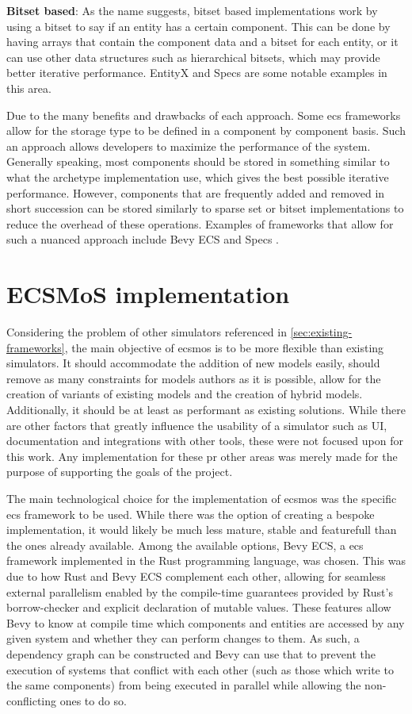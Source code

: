 \documentclass[twoside, 11pt]{article}
\begin{document}
\textbf{Bitset based}: As the name suggests, bitset based implementations work by using a bitset to say if an entity has a certain component. This can be done by having arrays that contain the component data and a bitset for each entity, or it can use other data structures such as hierarchical bitsets, which may provide better iterative performance. EntityX \cite{entityx} and Specs \cite{specs} are some notable examples in this area.

Due to the many benefits and drawbacks of each approach. Some \gls{ecs} frameworks allow for the storage type to be defined in a component by component basis. Such an approach allows developers to maximize the performance of the system. Generally speaking, most components should be stored in something similar to what the archetype implementation use, which gives the best possible iterative performance. However, components that are frequently added and removed in short succession can be stored similarly to sparse set or bitset implementations to reduce the overhead of these operations. Examples of frameworks that allow for such a nuanced approach include Bevy ECS \cite{bevy} and Specs \cite{specs}.

\section{ ECSMoS implementation} \label{sec:ecsmos-implementation}

Considering the problem of other simulators referenced in \autoref{sec:existing-frameworks}, the main objective of \gls{ecsmos} is to be more flexible than existing simulators. It should accommodate the addition of new models easily, should remove as many constraints for models authors as it is possible, allow for the creation of variants of existing models and the creation of hybrid models. Additionally, it should be at least as performant as existing solutions. While there are other factors that greatly influence the usability of a simulator such as UI, documentation and integrations with other tools, these were not focused upon for this work. Any implementation for these pr other areas was merely made for the purpose of supporting the goals of the project.

The main technological choice for the implementation of \gls{ecsmos} was the specific \gls{ecs} framework to be used. While there was the option of creating a bespoke implementation, it would likely be much less mature, stable and featurefull than the ones already available. Among the available options, Bevy ECS, a \gls{ecs} framework implemented in the Rust programming language, was chosen. This was due to how Rust and Bevy ECS complement each other, allowing for seamless external parallelism enabled by the compile-time guarantees provided by Rust's borrow-checker and explicit declaration of mutable values. These features allow Bevy to know at compile time which components and entities are accessed by any given system and whether they can perform changes to them. As such, a dependency graph can be constructed and Bevy can use that to prevent the execution of systems that conflict with each other (such as those which write to the same components) from being executed in parallel while allowing the non-conflicting ones to do so.
\end{document}
